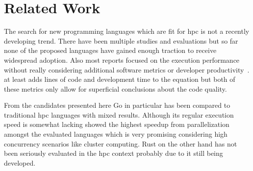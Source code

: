 \section{Related Work}
\label{sec:Concept::Related}

The search for new programming languages which are fit for \gls{hpc} is not a recently developing trend. There have been multiple studies and evaluations but so far none of the proposed languages have gained enough traction to receive widespread adoption. Also most reports focused on the execution performance without really considering additional software metrics or developer productivity~\cite{related_multicore}. at least adds lines of code and development time to the equation but both of these metrics only allow for superficial conclusions about the code quality.

From the candidates presented here Go in particular has been compared to traditional \gls{hpc} languages with mixed results. Although its regular execution speed is somewhat lacking \cite{related_sor_study} showed the highest speedup from parallelization amongst the evaluated languages which is very promising considering high concurrency scenarios like cluster computing. Rust on the other hand has not been seriously evaluated in the \gls{hpc} context probably due to it still being developed.
